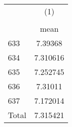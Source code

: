 {
\def\sym#1{\ifmmode^{#1}\else\(^{#1}\)\fi}
\begin{tabular}{l*{1}{c}}
\hline\hline
                    &\multicolumn{1}{c}{(1)}\\
                    &\multicolumn{1}{c}{}\\
                    &        mean\\
\hline
633                 &     7.39368\\
634                 &    7.310616\\
635                 &    7.252745\\
636                 &     7.31011\\
637                 &    7.172014\\
Total               &    7.315421\\
\hline\hline
\end{tabular}
}
